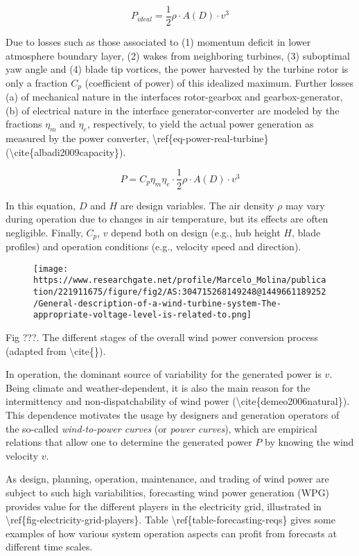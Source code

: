 \documentclass[
]{article}
\begin{document}
\[P_{ideal} = \frac{1}{2}\rho \cdot A(D)\cdot v^3\]

Due to losses such as those associated to (1) momentum deficit in lower
atmosphere boundary layer, (2) wakes from neighboring turbines, (3)
suboptimal yaw angle and (4) blade tip vortices, the power harvested by
the turbine rotor is only a fraction \(C_p\) (coefficient of power) of
this idealized maximum. Further losses (a) of mechanical nature in the
interfaces rotor-gearbox and gearbox-generator, (b) of electrical nature
in the interface generator-converter are modeled by the fractions
\(\eta_{m}\) and \(\eta_{e}\), respectively, to yield the actual power
generation as measured by the power converter,
\textbackslash ref\{eq-power-real-turbine\}
(\textbackslash cite\{albadi2009capacity\}).

\[P = C_p\eta_{m} \eta_{e}  \cdot \frac{1}{2}\rho \cdot A(D)\cdot v^3\]

In this equation, \(D\) and \(H\) are design variables. The air density
\(\rho\) may vary during operation due to changes in air temperature,
but its effects are often negligible. Finally, \(C_p\), \(v\) depend
both on design (e.g., hub height \(H\), blade profiles) and operation
conditions (e.g., velocity speed and direction).

\begin{figure}
\centering
\texttt{[image: https://www.researchgate.net/profile/Marcelo\_Molina/publication/221911675/figure/fig2/AS:304715268149248@1449661189252/General-description-of-a-wind-turbine-system-The-appropriate-voltage-level-is-related-to.png]}
\caption{}
\end{figure}

Fig ???. The different stages of the overall wind power conversion
process (adapted from \textbackslash cite\{\}).

In operation, the dominant source of variability for the generated power
is \(v\). Being climate and weather-dependent, it is also the main
reason for the intermittency and non-dispatchability of wind power
(\textbackslash cite\{demeo2006natural\}). This dependence motivates the
usage by designers and generation operators of the so-called
\emph{wind-to-power curves} (or \emph{power curves}), which are
empirical relations that allow one to determine the generated power
\(P\) by knowing the wind velocity \(v\).

As design, planning, operation, maintenance, and trading of wind power
are subject to such high variabilities, forecasting wind power
generation (WPG) provides value for the different players in the
electricity grid, illustrated in
\textbackslash ref\{fig-electricity-grid-players\}. Table
\textbackslash ref\{table-forecasting-reqs\} gives some examples of how
various system operation aspects can profit from forecasts at different
time scales.
\end{document}
